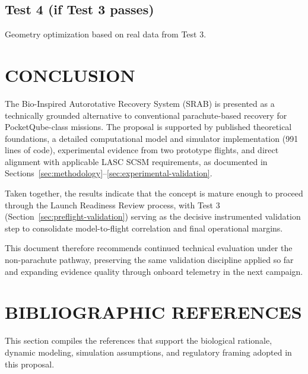 \documentclass[12pt,a4paper]{article}
\begin{document}
\subsection{Test 4 (if Test 3 passes)}

Geometry optimization based on real data from Test 3.

\vspace{0.5em}

\section*{CONCLUSION}
\label{sec:conclusion}

The Bio-Inspired Autorotative Recovery System (SRAB) is presented as a technically grounded alternative to conventional parachute-based recovery for PocketQube-class missions. The proposal is supported by published theoretical foundations, a detailed computational model and simulator implementation (991 lines of code), experimental evidence from two prototype flights, and direct alignment with applicable LASC SCSM requirements, as documented in Sections~\ref{sec:methodology}--\ref{sec:experimental-validation}.

Taken together, the results indicate that the concept is mature enough to proceed through the Launch Readiness Review process, with Test 3 (Section~\ref{sec:preflight-validation}) serving as the decisive instrumented validation step to consolidate model-to-flight correlation and final operational margins.

This document therefore recommends continued technical evaluation under the non-parachute pathway, preserving the same validation discipline applied so far and expanding evidence quality through onboard telemetry in the next campaign.

\vspace{0.5em}

\section{BIBLIOGRAPHIC REFERENCES}
\label{sec:references}

This section compiles the references that support the biological rationale, dynamic modeling, simulation assumptions, and regulatory framing adopted in this proposal.
\end{document}
